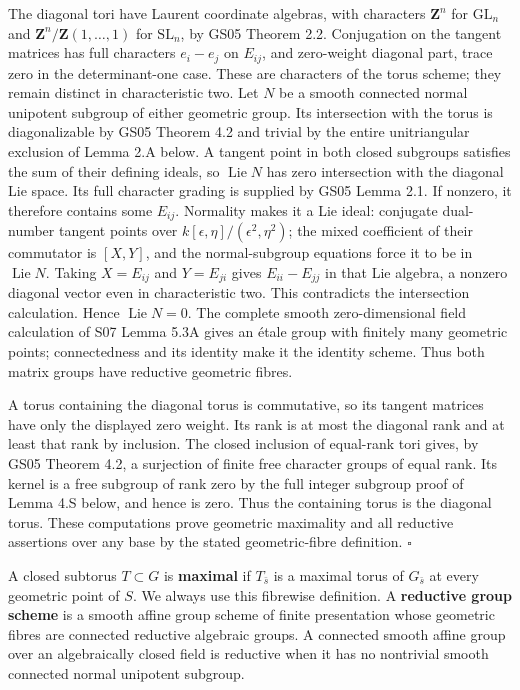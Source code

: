 \documentclass[11pt,a4paper,openany]{report}
\begin{document}
The diagonal tori have Laurent coordinate algebras, with characters \(\mathbf Z^n\) for \(\mathrm{GL}_n\) and \(\mathbf Z^n/\mathbf Z(1,\ldots,1)\) for \(\mathrm{SL}_n\), by GS05 Theorem 2.2. Conjugation on the tangent matrices has full characters \(e_i-e_j\) on \(E_{ij}\), and zero-weight diagonal part, trace zero in the determinant-one case. These are characters of the torus scheme; they remain distinct in characteristic two. Let \(N\) be a smooth connected normal unipotent subgroup of either geometric group. Its intersection with the torus is diagonalizable by GS05 Theorem 4.2 and trivial by the entire unitriangular exclusion of Lemma 2.A below. A tangent point in both closed subgroups satisfies the sum of their defining ideals, so \(\operatorname{Lie}N\) has zero intersection with the diagonal Lie space. Its full character grading is supplied by GS05 Lemma 2.1. If nonzero, it therefore contains some \(E_{ij}\). Normality makes it a Lie ideal: conjugate dual-number tangent points over \(k[\epsilon,\eta]/(\epsilon^2,\eta^2)\); the mixed coefficient of their commutator is \([X,Y]\), and the normal-subgroup equations force it to be in \(\operatorname{Lie}N\). Taking \(X=E_{ij}\) and \(Y=E_{ji}\) gives \(E_{ii}-E_{jj}\) in that Lie algebra, a nonzero diagonal vector even in characteristic two. This contradicts the intersection calculation. Hence \(\operatorname{Lie}N=0\). The complete smooth zero-dimensional field calculation of S07 Lemma 5.3A gives an étale group with finitely many geometric points; connectedness and its identity make it the identity scheme. Thus both matrix groups have reductive geometric fibres.

A torus containing the diagonal torus is commutative, so its tangent matrices have only the displayed zero weight. Its rank is at most the diagonal rank and at least that rank by inclusion. The closed inclusion of equal-rank tori gives, by GS05 Theorem 4.2, a surjection of finite free character groups of equal rank. Its kernel is a free subgroup of rank zero by the full integer subgroup proof of Lemma 4.S below, and hence is zero. Thus the containing torus is the diagonal torus. These computations prove geometric maximality and all reductive assertions over any base by the stated geometric-fibre definition. \(\square\)

A closed subtorus \(T\subset G\) is \textbf{maximal} if \(T_{\bar s}\) is a maximal torus of \(G_{\bar s}\) at every geometric point of \(S\). We always use this fibrewise definition. A \textbf{reductive group scheme} is a smooth affine group scheme of finite presentation whose geometric fibres are connected reductive algebraic groups. A connected smooth affine group over an algebraically closed field is reductive when it has no nontrivial smooth connected normal unipotent subgroup.
\end{document}

